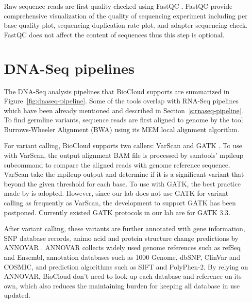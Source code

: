 Raw sequence reads are first quality checked using FastQC \cite{:fastqc}.
FastQC provide comprehensive visualization of the quality of sequencing
experiment including per base quality plot, sequencing duplication rate plot,
and adapter sequencing check. FastQC does not affect the content of sequences
thus this step is optional.



\section{DNA-Seq pipelines}
\label{s:dnaseq-pipeline}

The DNA-Seq analysis pipelines that BioCloud supports are summarized in
Figure~\ref{fig:dnaseq-pipeline}. Some of the tools overlap with RNA-Seq
pipelines which have been already mentioned and described in
Section~\ref{s:rnaseq-pipeline}. To find germline variants, sequence reads are
first aligned to genome by the tool Burrows-Wheeler Alignment (BWA)
\cite{li2009:fast} using its MEM local alignment algorithm.



For variant calling, BioCloud supports two callers: VarScan
\cite{koboldt2012:varscan} and GATK
\cite{vanderauwera2013:fastq,mckenna2010:genome}. To use with VarScan, the
output alignment BAM file is processed by samtools' mpileup subcommand to
compare the aligned reads with genome reference sequence. VarScan take the
mpileup output and determine if it is a significant variant that beyond the
given threshold for each base. To use with GATK, the best practice
\cite{vanderauwera2013:fastq} made by \citeauthor{vanderauwera2013:fastq} is
adopted. However, since our lab does not use GATK for variant calling as
frequently as VarScan, the development to support GATK has been postponed.
Currently existed GATK protocols in our lab are for GATK 3.3.

After variant calling, these variants are further annotated with gene
information, SNP database records, animo acid and protein structure change
predictions by ANNOVAR \cite{wang2010:annovar}. ANNOVAR collects widely used
genome references such as refSeq and Ensembl, annotation databases such as 1000
Genome, dbSNP, ClinVar and COSMIC, and prediction algorithms such as SIFT and
PolyPhen-2. By relying on ANNOVAR, BioCloud don't need to look up each database
and reference on its own, which also reduces the maintaining burden for keeping
all database in use updated.



